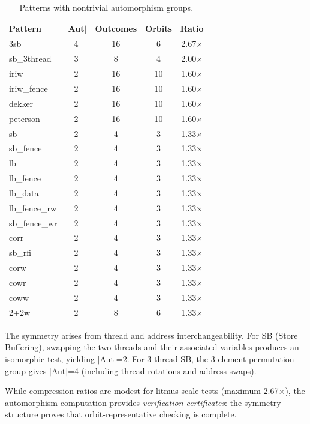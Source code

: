 \documentclass[10pt]{article}
\begin{document}
\begin{table}[h]
\centering
\caption{Patterns with nontrivial automorphism groups.}
\label{tab:symmetry}
\small
\begin{tabular}{lcccc}
\toprule
\textbf{Pattern} & \textbf{$|$Aut$|$} & \textbf{Outcomes} & \textbf{Orbits} & \textbf{Ratio} \\
\midrule
3sb & 4 & 16 & 6 & 2.67$\times$ \\
sb\_3thread & 3 & 8 & 4 & 2.00$\times$ \\
iriw & 2 & 16 & 10 & 1.60$\times$ \\
iriw\_fence & 2 & 16 & 10 & 1.60$\times$ \\
dekker & 2 & 16 & 10 & 1.60$\times$ \\
peterson & 2 & 16 & 10 & 1.60$\times$ \\
sb & 2 & 4 & 3 & 1.33$\times$ \\
sb\_fence & 2 & 4 & 3 & 1.33$\times$ \\
lb & 2 & 4 & 3 & 1.33$\times$ \\
lb\_fence & 2 & 4 & 3 & 1.33$\times$ \\
lb\_data & 2 & 4 & 3 & 1.33$\times$ \\
lb\_fence\_rw & 2 & 4 & 3 & 1.33$\times$ \\
sb\_fence\_wr & 2 & 4 & 3 & 1.33$\times$ \\
corr & 2 & 4 & 3 & 1.33$\times$ \\
sb\_rfi & 2 & 4 & 3 & 1.33$\times$ \\
corw & 2 & 4 & 3 & 1.33$\times$ \\
cowr & 2 & 4 & 3 & 1.33$\times$ \\
coww & 2 & 4 & 3 & 1.33$\times$ \\
2+2w & 2 & 8 & 6 & 1.33$\times$ \\
\bottomrule
\end{tabular}
\end{table}

The symmetry arises from thread and address interchangeability. For
SB (Store Buffering), swapping the two threads and their associated
variables produces an isomorphic test, yielding $|$Aut$|$=2. For
3-thread SB, the 3-element permutation group gives $|$Aut$|$=4
(including thread rotations and address swaps).

While compression ratios are modest for litmus-scale tests (maximum
2.67$\times$), the automorphism computation provides
\emph{verification certificates}: the symmetry structure proves
that orbit-representative checking is complete.
\end{document}

